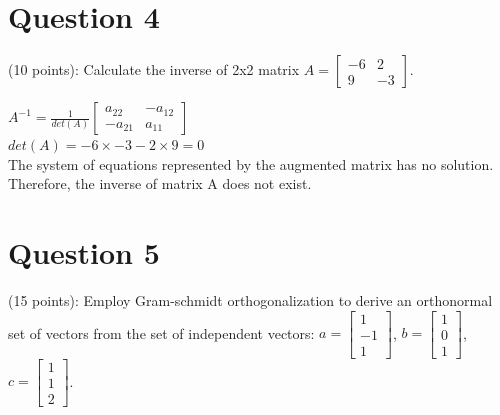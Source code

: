 \documentclass{article}
\begin{document}
%
\vfill\break
\section*{Question 4} (10 points): Calculate the inverse of 2x2 matrix $A = \begin{bmatrix}-6 & 2 \\ 9 & -3\end{bmatrix}$.

\noindent
$A^{-1} = \frac{1}{det(A)}\begin{bmatrix}a_{22} & -a_{12} \\ -a_{21} & a_{11} \end{bmatrix}$ \\
$det(A) = -6 \times -3 - 2 \times 9 = 0$ \\
The system of equations represented by the augmented matrix has no solution. Therefore, the inverse of matrix A does not exist.

%
\vfill\break
\section*{Question 5} (15 points): Employ Gram-schmidt orthogonalization to derive an orthonormal set of vectors from the set of independent vectors: $a = \begin{bmatrix}1 \\ -1 \\ 1\end{bmatrix}$, $b = \begin{bmatrix}1 \\ 0 \\ 1\end{bmatrix}$, $c = \begin{bmatrix}1 \\ 1 \\ 2\end{bmatrix}$.
\end{document}

